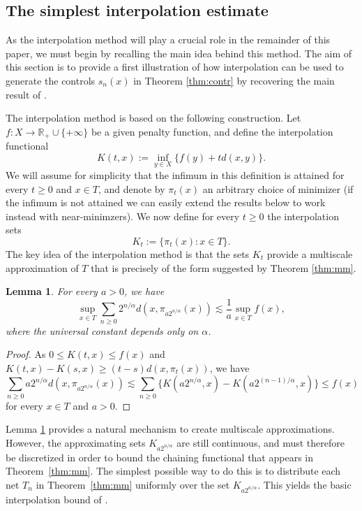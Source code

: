 \documentclass[10pt,reqno]{amsart}
\newtheorem{lem}[thm]{Lemma}
\theoremstyle{definition}
\numberwithin{equation}{section}
\numberwithin{figure}{section}
\numberwithin{table}{section}
\begin{document}
\subsection{The simplest interpolation estimate}
\label{sec:interp}

As the interpolation method will play a crucial role in the remainder of 
this paper, we must begin by recalling the main idea behind this method. 
The aim of this section is to provide a first illustration of how 
interpolation can be used to generate the controls $s_n(x)$ in Theorem 
\ref{thm:contr} by recovering the main result of \cite{vH16a}.

The interpolation method is based on the following construction. Let 
$f:X\to\mathbb{R}_+\cup\{+\infty\}$ be a given penalty function, and 
define the interpolation functional
$$
	K(t,x) := \inf_{y\in X} \{f(y) + td(x,y)\}.
$$
We will assume for simplicity that the infimum in this definition is 
attained for every $t\ge 0$ and $x\in T$, and denote by $\pi_t(x)$ an 
arbitrary choice of minimizer (if the infimum is not attained we can 
easily extend the results below to work instead with near-minimzers).
We now define for every $t\ge 0$ the interpolation sets
$$
	K_t := \{\pi_t(x):x\in T\}.
$$
The key idea of the interpolation method is that the sets $K_t$ 
provide a multiscale approximation of $T$ that is precisely 
of the form suggested by Theorem \ref{thm:mm}.

\begin{lem}
\label{lem:interp}
For every $a>0$, we have
$$
	\sup_{x\in T}\sum_{n\ge 0}2^{n/\alpha}d(x,\pi_{a2^{n/\alpha}}(x)) 
	\lesssim
	\frac{1}{a}\sup_{x\in T}f(x),
$$
where the universal constant depends only on $\alpha$.
\end{lem}

\begin{proof}
As $0\le K(t,x)\le f(x)$ and 
$K(t,x)-K(s,x) \ge (t-s)d(x,\pi_t(x))$, we have
$$
	\sum_{n\ge 0} a2^{n/\alpha} d(x,\pi_{a2^{n/\alpha}}(x)) \lesssim
	\sum_{n\ge 0} \{K(a2^{n/\alpha},x)-K(a2^{(n-1)/\alpha},x)\}
	\le f(x)
$$
for every $x\in T$ and $a>0$.
\end{proof}

Lemma \ref{lem:interp} provides a natural mechanism to create multiscale 
approximations. However, the approximating sets $K_{a2^{n/\alpha}}$ are 
still continuous, and must therefore be discretized in order to bound the 
chaining functional that appears in Theorem~\ref{thm:mm}. The simplest 
possible way to do this is to distribute each net $T_n$ in 
Theorem~\ref{thm:mm} uniformly over the set $K_{a2^{n/\alpha}}$. This yields the 
basic interpolation bound of \cite{vH16a}.
\end{document}
